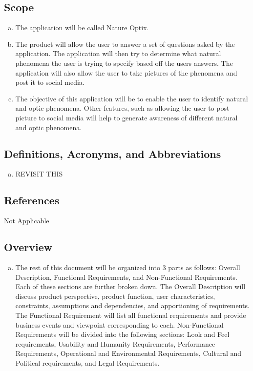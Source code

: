 \documentclass[]{article}
\begin{document}
\subsection{Scope}
\label{sub:scope}
\begin{enumerate}[a)]
	\item The application will be called Nature Optix.
	\item The product will allow the user to answer a set of questions asked by the application. The application will then try to determine what natural phenomena the user is trying to specify based off the users answers. The application will also allow the user to take pictures of the phenomena and post it to social media. 
	\item The objective of this application will be to enable the user to identify natural and optic phenomena. Other features, such as allowing the user to post picture to social media will help to generate awareness of different natural and optic phenomena. 
\end{enumerate}

\subsection{Definitions, Acronyms, and Abbreviations}
\label{sub:definitions_acronyms_and_abbreviations}
\begin{enumerate}[a)]
	\item REVISIT THIS
\end{enumerate}

\subsection{References}
\label{sub:references}
Not Applicable

\subsection{Overview}
\label{sub:overview}
\begin{enumerate}[a)]
	\item The rest of this document will be organized into 3 parts as follows: Overall Description, Functional Requirements, and Non-Functional Requirements. Each of these sections are further broken down. The Overall Description will discuss product perspective, product function, user characteristics, constraints, assumptions and dependencies, and apportioning of requirements. The Functional Requirement will list all functional requirements and provide business events and viewpoint corresponding to each. Non-Functional Requirements will be divided into the following sections: Look and Feel requirements, Usability and Humanity Requirements, Performance Requirements, Operational and Environmental Requirements, Cultural and Political requirements, and Legal Requirements. 
\end{enumerate}
\end{document}
